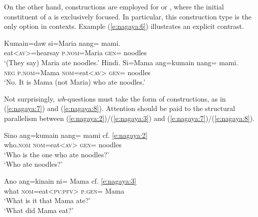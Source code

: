 \documentclass[output=paper]{langsci/langscibook}
\begin{document}
\noindent
On the other hand,  constructions are employed for  or , where the initial constituent of a  is exclusively focused. In particular, this construction type is the only option in  contexts. Example (\ref{e:nagaya:6}) illustrates an explicit contrast.

\begin{exe}
	\ex\label{e:nagaya:6}
	\begin{xlist}
		\gll K{\USSmaller}um{\USGreater}ain=daw  si=Maria    nang=  mami.\\
		eat<\textsc{av}>=hearsay  \textsc{p.nom}=Maria  \textsc{gen}=  noodles\\
		\glt ‘(They say) Maria ate noodles.’
		\gll Hindi. Si=Mama  ang={\ob}k{\USSmaller}um{\USGreater}ain  nang=  mami{\cb}.\\
		\textsc{neg}  \textsc{p.nom}=Mama \textsc{nom}=eat<\textsc{av}>  \textsc{gen}= noodles\\
		\glt ‘No. It is Mama (not Maria) who ate noodles.’
	\end{xlist}
\end{exe}

\noindent
Not surprisingly, \textit{wh}-questions must take the form of  constructions, as in (\ref{e:nagaya:7}) and (\ref{e:nagaya:8}). Attention should be paid to the structural parallelism between (\ref{e:nagaya:2})/(\ref{e:nagaya:3}) and (\ref{e:nagaya:7})/(\ref{e:nagaya:8}).

\begin{exe}
	\ex\label{e:nagaya:7}
	\gll Sino ang={\ob}k{\USSmaller}um{\USGreater}ain nang= mami{\cb}{\USQMark}  {\ob}cf. {\USOParen}\ref{e:nagaya:2}{\USCParen}{\cb}\\
	who.\textsc{nom}  \textsc{nom}=eat<\textsc{av}>  \textsc{gen}=  noodles\\
	\glt ‘Who is the one who ate noodles?’\\
	\glt ‘Who ate noodles?’
\end{exe}

\begin{exe}
	\ex\label{e:nagaya:8}
	\gll Ano  ang={\ob}k{\USSmaller}in{\USGreater}ain ni= Mama{\cb}{\USQMark}  {\ob}cf. {\USOParen}\ref{e:nagaya:3}{\USCParen}{\cb}\\
	what \textsc{nom}=eat<\textsc{pv:pfv}>  \textsc{p.gen}=  Mama\\
	\glt ‘What is it that Mama ate?’\\
	\glt ‘What did Mama eat?’
\end{exe}
\end{document}
